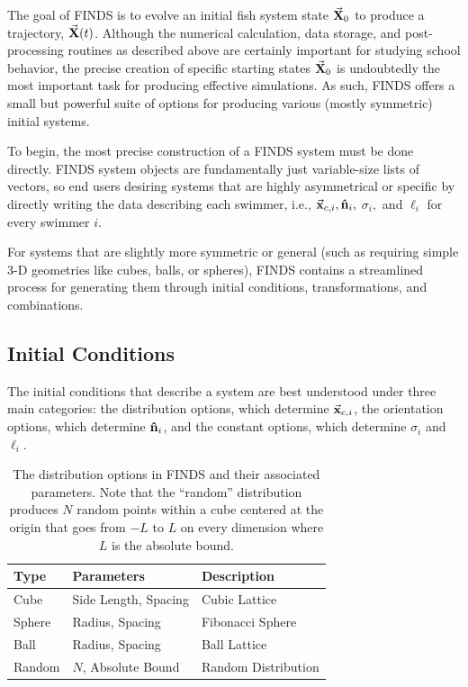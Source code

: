 \documentclass[letterpaper, 10pt, twoside]{LTJournalArticle}
\begin{document}
The goal of FINDS is to evolve an initial fish system state $\va{X}_0$ to
produce a trajectory, $\va{X}(t)$. Although the numerical calculation, data
storage, and post-processing routines as described above are certainly important
for studying school behavior, the precise creation of specific starting states
$\va{X}_0$ is undoubtedly the most important task for producing effective
simulations. As such, FINDS offers a small but powerful suite of options for
producing various (mostly symmetric) initial systems.

To begin, the most precise construction of a FINDS system must be done directly.
FINDS system objects are fundamentally just variable-size lists of vectors, so
end users desiring systems that are highly asymmetrical or specific by directly
writing the data describing each swimmer, i.e., $\va{x}_{c,i}, \vu{n}_i,$
$\sigma_i,$ and $\ell_i$ for every swimmer $i$.

For systems that are slightly more symmetric or general (such as requiring
simple 3-D geometries like cubes, balls, or spheres), FINDS contains a
streamlined process for generating them through initial conditions,
transformations, and combinations.

\subsection{Initial Conditions}
\label{subsection-initial-conditions}

The initial conditions that describe a system are best understood under three
main categories: the distribution options, which determine $\va{x}_{c,i}$, the
orientation options, which determine $\vu{n}_i$, and the constant options,
which determine $\sigma_i$ and $\ell_i$.

\begin{table}[htbp]
\centering
\begin{tabular}{lll}
\textbf{Type} & \textbf{Parameters}  & \textbf{Description} \\ \hline
Cube          & Side Length, Spacing & Cubic Lattice        \\
Sphere        & Radius, Spacing      & Fibonacci Sphere     \\
Ball          & Radius, Spacing      & Ball Lattice         \\
Random        & $N$, Absolute Bound  & Random Distribution
\end{tabular}
\caption{The distribution options in FINDS and their associated parameters.
  Note that the ``random'' distribution produces $N$ random points within a
  cube centered at the origin that goes from $-L$ to $L$ on every dimension
  where $L$ is the absolute bound.
}
\label{tbl-distribution-options}
\end{table}
\end{document}
